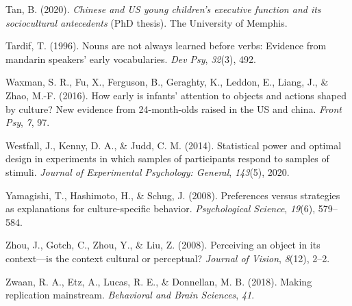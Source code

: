 \documentclass[
  man,floatsintext]{apa6}
\newlength{\cslhangindent}
\newlength{\cslentryspacingunit} %
\newenvironment{CSLReferences}[2] %
 {%
  \setlength{\parindent}{0pt}
  \ifodd #1
  \let\oldpar\par
  \def\par{\hangindent=\cslhangindent\oldpar}
  \fi
  \setlength{\parskip}{#2\cslentryspacingunit}
 }%
 {}
\begin{document}
\begin{CSLReferences}{1}{0}
\leavevmode{}%
Tan, B. (2020). \emph{Chinese and US young children's executive function and its sociocultural antecedents} (PhD thesis). The University of Memphis.

\leavevmode{}%
Tardif, T. (1996). Nouns are not always learned before verbs: Evidence from mandarin speakers' early vocabularies. \emph{Dev Psy}, \emph{32}(3), 492.

\leavevmode{}%
Waxman, S. R., Fu, X., Ferguson, B., Geraghty, K., Leddon, E., Liang, J., \& Zhao, M.-F. (2016). How early is infants' attention to objects and actions shaped by culture? New evidence from 24-month-olds raised in the US and china. \emph{Front Psy}, \emph{7}, 97.

\leavevmode{}%
Westfall, J., Kenny, D. A., \& Judd, C. M. (2014). Statistical power and optimal design in experiments in which samples of participants respond to samples of stimuli. \emph{Journal of Experimental Psychology: General}, \emph{143}(5), 2020.

\leavevmode{}%
Yamagishi, T., Hashimoto, H., \& Schug, J. (2008). Preferences versus strategies as explanations for culture-specific behavior. \emph{Psychological Science}, \emph{19}(6), 579--584.

\leavevmode{}%
Zhou, J., Gotch, C., Zhou, Y., \& Liu, Z. (2008). Perceiving an object in its context---is the context cultural or perceptual? \emph{Journal of Vision}, \emph{8}(12), 2--2.

\leavevmode{}%
Zwaan, R. A., Etz, A., Lucas, R. E., \& Donnellan, M. B. (2018). Making replication mainstream. \emph{Behavioral and Brain Sciences}, \emph{41}.

\end{CSLReferences}
\end{document}
